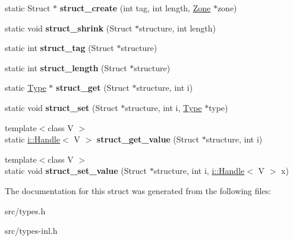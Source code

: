 \begin{DoxyCompactItemize}
\item 
\hypertarget{structv8_1_1internal_1_1_zone_type_config_a61046e75a5da77aedb0d9eff7bcc3d38}{}static Struct $\ast$ {\bfseries struct\+\_\+create} (int tag, int length, \hyperlink{classv8_1_1internal_1_1_zone}{Zone} $\ast$zone)\label{structv8_1_1internal_1_1_zone_type_config_a61046e75a5da77aedb0d9eff7bcc3d38}

\item 
\hypertarget{structv8_1_1internal_1_1_zone_type_config_a1123493a79bb89b940a0dde2a306aa84}{}static void {\bfseries struct\+\_\+shrink} (Struct $\ast$structure, int length)\label{structv8_1_1internal_1_1_zone_type_config_a1123493a79bb89b940a0dde2a306aa84}

\item 
\hypertarget{structv8_1_1internal_1_1_zone_type_config_a97e24dcbc607e1a4874c14cdd52af57a}{}static int {\bfseries struct\+\_\+tag} (Struct $\ast$structure)\label{structv8_1_1internal_1_1_zone_type_config_a97e24dcbc607e1a4874c14cdd52af57a}

\item 
\hypertarget{structv8_1_1internal_1_1_zone_type_config_a825b378b4bdda814401cec0e8efecb5c}{}static int {\bfseries struct\+\_\+length} (Struct $\ast$structure)\label{structv8_1_1internal_1_1_zone_type_config_a825b378b4bdda814401cec0e8efecb5c}

\item 
\hypertarget{structv8_1_1internal_1_1_zone_type_config_a1541f158737ad5286192cbd377c1ee14}{}static \hyperlink{classv8_1_1internal_1_1_type_impl}{Type} $\ast$ {\bfseries struct\+\_\+get} (Struct $\ast$structure, int i)\label{structv8_1_1internal_1_1_zone_type_config_a1541f158737ad5286192cbd377c1ee14}

\item 
\hypertarget{structv8_1_1internal_1_1_zone_type_config_a2ef0564032926941a2c4f1757f2124c9}{}static void {\bfseries struct\+\_\+set} (Struct $\ast$structure, int i, \hyperlink{classv8_1_1internal_1_1_type_impl}{Type} $\ast$type)\label{structv8_1_1internal_1_1_zone_type_config_a2ef0564032926941a2c4f1757f2124c9}

\item 
\hypertarget{structv8_1_1internal_1_1_zone_type_config_af08121fadcad05256a864303ead85a99}{}{\footnotesize template$<$class V $>$ }\\static \hyperlink{classv8_1_1internal_1_1_handle}{i\+::\+Handle}$<$ V $>$ {\bfseries struct\+\_\+get\+\_\+value} (Struct $\ast$structure, int i)\label{structv8_1_1internal_1_1_zone_type_config_af08121fadcad05256a864303ead85a99}

\item 
\hypertarget{structv8_1_1internal_1_1_zone_type_config_afe6a723b07dc0a678565e71a888c45c5}{}{\footnotesize template$<$class V $>$ }\\static void {\bfseries struct\+\_\+set\+\_\+value} (Struct $\ast$structure, int i, \hyperlink{classv8_1_1internal_1_1_handle}{i\+::\+Handle}$<$ V $>$ x)\label{structv8_1_1internal_1_1_zone_type_config_afe6a723b07dc0a678565e71a888c45c5}

\end{DoxyCompactItemize}


The documentation for this struct was generated from the following files\+:\begin{DoxyCompactItemize}
\item 
src/types.\+h\item 
src/types-\/inl.\+h\end{DoxyCompactItemize}
